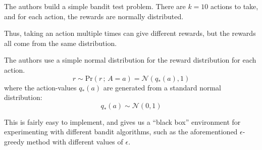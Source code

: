 \bit
	\item The authors build a simple bandit test problem. There are $k=10$ actions to take, and for each action, the rewards are normally distributed. 
	\bit
		\item Thus, taking an action multiple times can give different rewards, but the rewards all come from the same distribution.
		\item The authors use a simple normal distribution for the reward distribution for each action.
		\begin{equation}
			r \sim \text{Pr}\left(r\,;\, A=a\right) = \mathcal{N}\left(q_*\left(a\right), 1\right)
		\end{equation}
		where the action-values $q_*\left(a\right)$ are generated from a standard normal distribution:
		\begin{equation}
			q_*\left(a\right) \sim \mathcal{N}\left(0,1\right)
		\end{equation}
		\item This is fairly easy to implement, and gives us a ``black box'' environment for experimenting with different bandit algorithms, such as the aforementioned $\epsilon$-greedy method with different values of $\epsilon$.
	\eit
\eit


